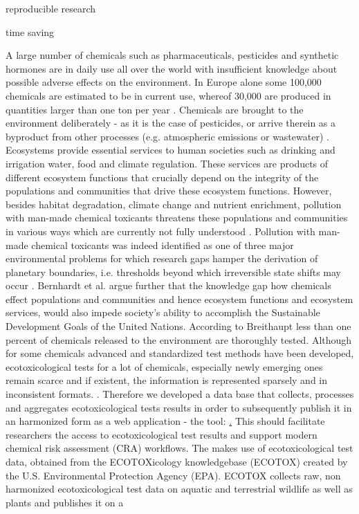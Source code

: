     \item reproducible research %
    
    \item time saving
\fi    

\iffalse

A large number of chemicals such as pharmaceuticals, pesticides and synthetic hormones are in daily use all over the world with insufficient knowledge about possible adverse effects on the environment. In Europe alone some 100,000 chemicals are estimated to be in current use, whereof 30,000 are produced in quantities larger than one ton per year \citep{breithaupt_costs_2006}. Chemicals are brought to the environment deliberately - as it is the case of pesticides, or arrive therein as a byproduct from other processes (e.g. atmospheric emissions or wastewater) \citep{schwarzenbach_challenge_2006}. Ecosystems provide essential services to human societies such as drinking and irrigation water, food and climate regulation. These services are products of different ecosystem functions that crucially depend on the integrity of the populations and communities that drive these ecosystem functions. However, besides habitat degradation, climate change and nutrient enrichment, pollution with man-made chemical toxicants threatens these populations and communities in various ways which are currently not fully understood \citep{steffen_anthropocene_2007}. Pollution with man-made chemical toxicants was indeed identified as one of three major environmental problems for which research gaps hamper the derivation of planetary boundaries, i.e. thresholds beyond which irreversible state shifts may occur \citep{steffen_anthropocene_2007}. Bernhardt et al. \citet{bernhardt_synthetic_2017} argue further that the knowledge gap how chemicals effect populations and communities and hence ecosystem functions and ecosystem services, would also impede society's ability to accomplish the Sustainable Development Goals of the United Nations. According to Breithaupt \citet{breithaupt_costs_2006} less than one percent of chemicals released to the environment are thoroughly tested. Although for some chemicals advanced and standardized \citep{oecd_oecd_2018} test methods have been developed, ecotoxicological tests for a lot of chemicals, especially newly emerging ones remain scarce and if existent, the information is represented sparsely and in inconsistent formats. \citep{gessner_fostering_2016}. Therefore we developed a data base that collects, processes and aggregates ecotoxicological tests results in order to subsequently publish it in an harmonized form as a web application - the \etoxbase{} tool: \href{http://139.14.20.252:3838/etox-base-shiny/}. This should facilitate researchers the access to ecotoxicological test results and support modern chemical risk assessment (CRA) workflows. The \etoxbase{} makes use of ecotoxicological test data, obtained from the ECOTOXicology knowledgebase (ECOTOX) created by the U.S. Environmental Protection Agency (EPA). ECOTOX collects raw, non harmonized ecotoxicological test data on aquatic and terrestrial wildlife as well as plants and publishes it on a 